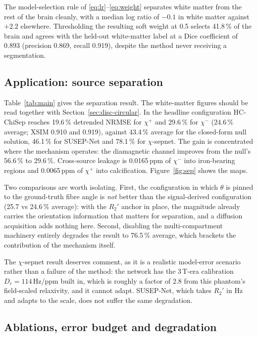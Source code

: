 \documentclass[AMA,STIX2COL,Linenumberson]{MRM}
\begin{document}
The model-selection rule of \eqref{eq:lr}--\eqref{eq:weight} separates white matter from the rest of the brain cleanly, with a median log ratio of $-0.1$ in white matter against $+2.2$ elsewhere. Thresholding the resulting soft weight at 0.5 selects 41.8\,\% of the brain and agrees with the held-out white-matter label at a Dice coefficient of 0.893 (precision 0.869, recall 0.919), despite the method never receiving a segmentation.

\subsection{Application: source separation}

Table~\ref{tab:main} gives the separation result. The white-matter figures should be read together with Section~\ref{sec:disc-circular}. In the headline configuration HC-ChiSep reaches 19.6\,\% detrended NRMSE for $\chi^{+}$ and 29.6\,\% for $\chi^{-}$ (24.6\,\% average; XSIM 0.910 and 0.919), against 43.4\,\% average for the closed-form null solution, 46.1\,\% for SUSEP-Net and 78.1\,\% for $\chi$-sepnet. The gain is concentrated where the mechanism operates: the diamagnetic channel improves from the null's 56.6\,\% to 29.6\,\%. Cross-source leakage is 0.0165\,ppm of $\chi^{-}$ into iron-bearing regions and 0.0065\,ppm of $\chi^{+}$ into calcification. Figure~\ref{fig:sep} shows the maps.

Two comparisons are worth isolating. First, the configuration in which $\theta$ is pinned to the ground-truth fibre angle is \emph{not} better than the signal-derived configuration (25.7 vs 24.6\,\% average): with the $R_2'$ anchor in place, the magnitude already carries the orientation information that matters for separation, and a diffusion acquisition adds nothing here. Second, disabling the multi-compartment machinery entirely degrades the result to 76.5\,\% average, which brackets the contribution of the mechanism itself.

The $\chi$-sepnet result deserves comment, as it is a realistic model-error scenario rather than a failure of the method: the network has the 3\,T-era calibration $D_r=114$\,Hz/ppm built in, which is roughly a factor of 2.8 from this phantom's field-scaled relaxivity, and it cannot adapt. SUSEP-Net, which takes $R_2'$ in Hz and adapts to the scale, does not suffer the same degradation.

\subsection{Ablations, error budget and degradation}
\label{sec:res-ablation}
\end{document}
